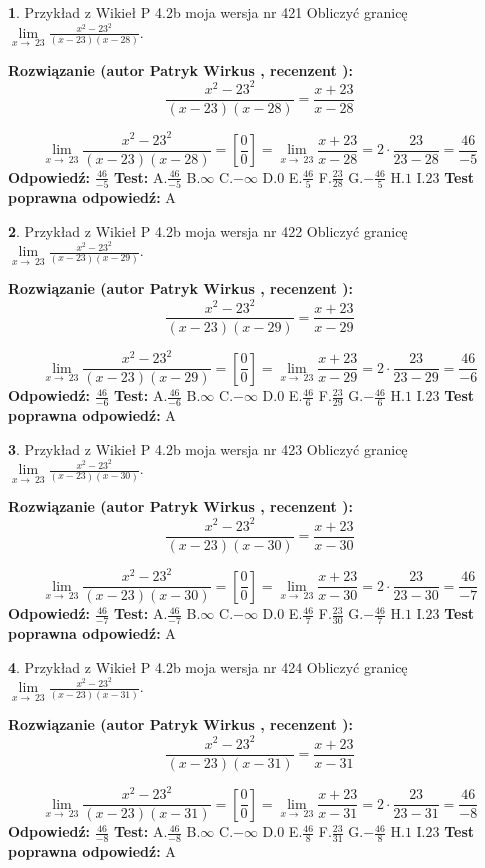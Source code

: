 \documentclass[12pt, a4paper]{article}
\theoremstyle{definition} %
\newtheorem{zad}{}
\newcommand{\zadStart}[1]{\begin{zad}#1\newline}
\newcommand{\zadStop}{\end{zad}}
\newcommand{\rozwStart}[2]{\noindent \textbf{Rozwiązanie (autor #1 , recenzent #2): }\newline}
\newcommand{\rozwStop}{\newline}
\newcommand{\odpStart}{\noindent \textbf{Odpowiedź:}\newline}
\newcommand{\odpStop}{\newline}
\newcommand{\testStart}{\noindent \textbf{Test:}\newline}
\newcommand{\testStop}{\newline}
\newcommand{\kluczStart}{\noindent \textbf{Test poprawna odpowiedź:}\newline}
\newcommand{\kluczStop}{\newline}
\begin{document}
\zadStart{Przykład z Wikieł P 4.2b moja wersja nr 421}
Obliczyć granicę $\lim\limits_{x\to\ 23}\frac{x^{2}-23^{2}}{(x-23)(x-28)}$.
\zadStop
\rozwStart{Patryk Wirkus}{}
$$\frac{x^{2}-23^{2}}{(x-23)(x-28)}=\frac{x+23}{x-28}$$

$$\lim\limits_{x\to\ 23}\frac{x^{2}-23^{2}}{(x-23)(x-28)}=[\frac{0}{0}]=\lim\limits_{x\to\ 23}\frac{x+23}{x-28}=2 \cdot \frac{23}{23-28} = \frac{46}{-5}$$
\rozwStop
\odpStart
$\frac{46}{-5}$
\odpStop
\testStart
A.$\frac{46}{-5}$
B.$\infty$
C.$-\infty$
D.$0$
E.$\frac{46}{5}$
F.$\frac{23}{28}$
G.$-\frac{46}{5}$
H.$1$
I.$23$
\testStop
\kluczStart
A
\kluczStop



\zadStart{Przykład z Wikieł P 4.2b moja wersja nr 422}
Obliczyć granicę $\lim\limits_{x\to\ 23}\frac{x^{2}-23^{2}}{(x-23)(x-29)}$.
\zadStop
\rozwStart{Patryk Wirkus}{}
$$\frac{x^{2}-23^{2}}{(x-23)(x-29)}=\frac{x+23}{x-29}$$

$$\lim\limits_{x\to\ 23}\frac{x^{2}-23^{2}}{(x-23)(x-29)}=[\frac{0}{0}]=\lim\limits_{x\to\ 23}\frac{x+23}{x-29}=2 \cdot \frac{23}{23-29} = \frac{46}{-6}$$
\rozwStop
\odpStart
$\frac{46}{-6}$
\odpStop
\testStart
A.$\frac{46}{-6}$
B.$\infty$
C.$-\infty$
D.$0$
E.$\frac{46}{6}$
F.$\frac{23}{29}$
G.$-\frac{46}{6}$
H.$1$
I.$23$
\testStop
\kluczStart
A
\kluczStop



\zadStart{Przykład z Wikieł P 4.2b moja wersja nr 423}
Obliczyć granicę $\lim\limits_{x\to\ 23}\frac{x^{2}-23^{2}}{(x-23)(x-30)}$.
\zadStop
\rozwStart{Patryk Wirkus}{}
$$\frac{x^{2}-23^{2}}{(x-23)(x-30)}=\frac{x+23}{x-30}$$

$$\lim\limits_{x\to\ 23}\frac{x^{2}-23^{2}}{(x-23)(x-30)}=[\frac{0}{0}]=\lim\limits_{x\to\ 23}\frac{x+23}{x-30}=2 \cdot \frac{23}{23-30} = \frac{46}{-7}$$
\rozwStop
\odpStart
$\frac{46}{-7}$
\odpStop
\testStart
A.$\frac{46}{-7}$
B.$\infty$
C.$-\infty$
D.$0$
E.$\frac{46}{7}$
F.$\frac{23}{30}$
G.$-\frac{46}{7}$
H.$1$
I.$23$
\testStop
\kluczStart
A
\kluczStop



\zadStart{Przykład z Wikieł P 4.2b moja wersja nr 424}
Obliczyć granicę $\lim\limits_{x\to\ 23}\frac{x^{2}-23^{2}}{(x-23)(x-31)}$.
\zadStop
\rozwStart{Patryk Wirkus}{}
$$\frac{x^{2}-23^{2}}{(x-23)(x-31)}=\frac{x+23}{x-31}$$

$$\lim\limits_{x\to\ 23}\frac{x^{2}-23^{2}}{(x-23)(x-31)}=[\frac{0}{0}]=\lim\limits_{x\to\ 23}\frac{x+23}{x-31}=2 \cdot \frac{23}{23-31} = \frac{46}{-8}$$
\rozwStop
\odpStart
$\frac{46}{-8}$
\odpStop
\testStart
A.$\frac{46}{-8}$
B.$\infty$
C.$-\infty$
D.$0$
E.$\frac{46}{8}$
F.$\frac{23}{31}$
G.$-\frac{46}{8}$
H.$1$
I.$23$
\testStop
\kluczStart
A
\kluczStop
\end{document}
